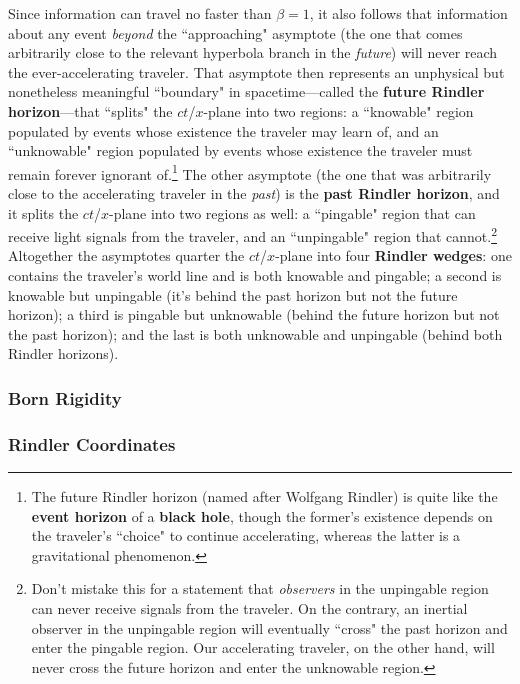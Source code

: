 \documentclass[12pt]{article}
\begin{document}
Since information can travel no faster than $\beta = 1$, it also follows that information about any event \emph{beyond} the ``approaching" asymptote (the one that comes arbitrarily close to the relevant hyperbola branch in the \emph{future}) will never reach the ever-accelerating traveler. That asymptote then represents an unphysical but nonetheless meaningful ``boundary" in spacetime---called the \textbf{future Rindler horizon}---that ``splits" the $ct$/$x$-plane into two regions: a ``knowable" region populated by events whose existence the traveler may learn of, and an ``unknowable" region populated by events whose existence the traveler must remain forever ignorant of.\footnote{The future Rindler horizon (named after Wolfgang Rindler) is quite like the \textbf{event horizon} of a \textbf{black hole}, though the former's existence depends on the traveler's ``choice" to continue accelerating, whereas the latter is a gravitational phenomenon.} The other asymptote (the one that was arbitrarily close to the accelerating traveler in the \emph{past}) is the \textbf{past Rindler horizon}, and it splits the $ct$/$x$-plane into two regions as well: a ``pingable" region that can receive light signals from the traveler, and an ``unpingable" region that cannot.\footnote{Don't mistake this for a statement that \emph{observers} in the unpingable region can never receive signals from the traveler. On the contrary, an inertial observer in the unpingable region will eventually ``cross" the past horizon and enter the pingable region. Our accelerating traveler, on the other hand, will never cross the future horizon and enter the unknowable region.} Altogether the asymptotes quarter the $ct$/$x$-plane into four \textbf{Rindler wedges}: one contains the traveler's world line and is both knowable and pingable; a second is knowable but unpingable (it's behind the past horizon but not the future horizon); a third is pingable but unknowable (behind the future horizon but not the past horizon); and the last is both unknowable and unpingable (behind both Rindler horizons).


\subsubsection{Born Rigidity}



\subsubsection{Rindler Coordinates}
\end{document}
